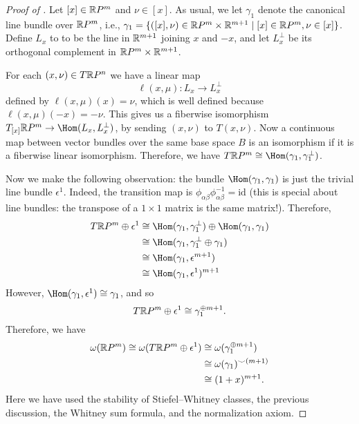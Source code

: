 \documentclass[ma3408.tex]{subfiles}
\begin{document}
\begin{proof}[Proof of ]
Let $[x] \in \mathbb{R} P^m$ and $\nu \in [x]$. As usual, we let $\gamma_1$ denote the canonical line bundle over $\mathbb{R} P^m$, i.e., $\gamma_1 = \{ ([x],\nu) \in \mathbb{R} P^m \times \mathbb{R}^{m+1} \mid [x] \in \mathbb{R} P^m, \nu \in [x] \}$. Define $L_x$ to to be the line in $\mathbb{R}^{m+1}$ joining $x$ and $-x$, and let $L_x^{\perp}$ be its orthogonal complement in $\mathbb{R} P^m \times \mathbb{R}^{m+1}$. 

For each $(x,\nu) \in T \mathbb{R} P^n$ we have a linear map
\[
\ell(x,\mu) \colon L_x \to L_x^{\perp}
\]
defined by $\ell(x,\mu)(x) = \nu$, which is well defined because $\ell(x,\mu)(-x) = -\nu$. This gives us a fiberwise isomorphism $T_{[x]}\bbR P^m \to \Hom(L_x,L_x^{\perp})$, by sending $(x,\nu)$ to $T(x,\nu)$. Now a continuous map between vector bundles over the same base space $B$ is an isomorphism if it is a fiberwise linear isomorphism. Therefore, we have $T \bbR P^m \cong \Hom(\gamma_1,\gamma_1^{\perp})$.

Now we make the following observation: the bundle $\Hom(\gamma_1,\gamma_1)$ is just the trivial line bundle $\epsilon^1$. Indeed, the transition map is $\phi_{\alpha\beta}\phi_{\alpha\beta}^{-1} = \text{id}$ (this is special about line bundles: the transpose of a $1 \times 1$ matrix is the same matrix!). Therefore,
\begin{align*}
T\bbR P^m \oplus \epsilon^1 &\cong \Hom(\gamma_1,\gamma_1^{\perp}) \oplus \Hom(\gamma_1,\gamma_1) \\
& \cong  \Hom(\gamma_1,\gamma_1^{\perp} \oplus \gamma_1) \\
& \cong \Hom(\gamma_1,\epsilon^{m+1}) \\
& \cong \Hom(\gamma_1,\epsilon^1)^{m+1}
\end{align*}
However, $\Hom(\gamma_1,\epsilon^1) \cong \gamma_1$, and so
\[
T\mathbb{R} P^m \oplus \epsilon^1 \cong \gamma_1^{\oplus m+1}. 
\]
Therefore, we have
\[
\begin{split}
\omega(\mathbb{R} P^m) \cong \omega(T \mathbb{R} P^m \oplus \epsilon^1) & \cong \omega(\gamma_1^{\oplus m+1})\\
& \cong \omega(\gamma_1)^{\smile(m+1)} \\
& \cong (1+x)^{m+1}.
\end{split}
\]
Here we have used the stability of Stiefel--Whitney classes, the previous discussion, the Whitney sum formula, and the normalization axiom. 
\end{proof}
\end{document}
